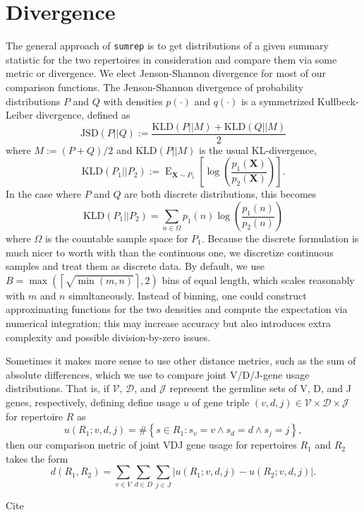 \documentclass{article}
\begin{document}
\section*{Divergence}
The general approach of \texttt{sumrep} is to get distributions of a given summary statistic for the two repertoires in consideration and compare them via some metric or divergence.
We elect Jenson-Shannon divergence for most of our comparison functions.
The Jenson-Shannon divergence of probability distributions $P$ and $Q$ with densities $p(\cdot)$ and $q(\cdot)$ is a symmetrized Kullbeck-Leiber divergence, defined as
\begin{equation}
\text{JSD}\left(P || Q\right) := \frac{\text{KLD}\left(P || M\right) + \text{KLD}\left(Q || M\right)}{2}
\end{equation}
where $M := (P + Q)/2$ and $\text{KLD}(P || M)$ is the usual KL-divergence,
\begin{equation}
\text{KLD}\left(P_1 || P_2\right) := \operatorname{E}_{\mathbf X \sim P_1}\left[ \log\left(\frac{p_1(\mathbf X)}{p_2(\mathbf X)}\right) \right].
\end{equation}
In the case where $P$ and $Q$ are both discrete distributions, this becomes
\begin{equation}
\text{KLD}\left(P_1 || P_2\right) = \sum_{n \in \Omega} p_1(n) \log\left( \frac{p_1(n)}{p_2(n)} \right)
\end{equation}
where $\Omega$ is the countable sample space for $P_1$.
Because the discrete formulation is much nicer to worth with than the continuous one, we discretize continuous samples and treat them as discrete data.
By default, we use $B = \max\left(\left\lceil \sqrt{\min(m, n)} \right \rceil, 2\right)$ bins of equal length, which scales reasonably with $m$ and $n$ simultaneously.
Instead of binning, one could construct approximating functions for the two densities and compute the expectation via numerical integration; this may increase accuracy but also introduces extra complexity and possible division-by-zero issues.

Sometimes it makes more sense to use other distance metrics, such as the sum of absolute differences, which we use to compare joint V/D/J-gene usage distributions. 
That is, if $\mathcal V$, $\mathcal D$, and $\mathcal J$ represent the germline sets of V, D, and J genes, respectively, 
defining define usage $u$ of gene triple $(v, d, j) \in \mathcal V \times \mathcal D \times \mathcal J$ for repertoire $R$ as
\begin{equation}
u(R_1; v, d, j) = \#\left\{s \in R_1: s_v = v \land s_d = d \land s_j = j\right\},
\end{equation}
then our comparison metric of joint VDJ gene usage for repertoires $R_1$ and $R_2$ takes the form
\begin{equation}
d(R_1, R_2) = \sum_{v \in V} \sum_{d \in D} \sum_{j \in J} \left| u(R_1; v, d, j) - u(R_2; v, d, j) \right|.
\end{equation}


Cite \cite{Felsenstein1981-zs}



\end{document}
